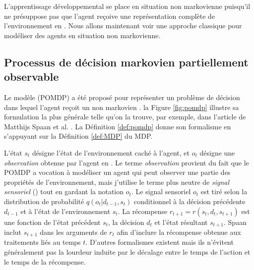 L'apprentissage développemental se place en situation non markovienne puisqu'il ne présuppose pas que l'agent reçoive une représentation complète de l'environnement en .
Nous allons maintenant voir une approche classique pour modéliser des agents en situation non markovienne. 



\subsection{Processus de décision markovien partiellement observable}
\label{sec:pomdp}

\noindent
Le modèle  (POMDP) a été proposé pour représenter un problème de décision dans lequel l'agent reçoit un  non markovien \cite{kaelbling_planning_1998}. 
la Figure \ref{fig:pomdp} illustre sa formulation la plus générale telle qu'on la trouve, par exemple, dans l'article de Matthijs Spaan et al. \cite{spaan_partially_2012}. 
La Définition \ref{def:pomdp} donne son formalisme en s'appuyant sur la Définition \ref{def:MDP} du MDP.

L'état $s_t$ désigne l'état de l'environnement caché à l'agent, et $o_t$ désigne une \emph{observation} obtenue par l'agent en .
Le terme \emph{observation} provient du fait que le POMDP a vocation à modéliser un agent qui peut observer une partie des propriétés de l'environnement, mais j'utilise le terme plus neutre de \emph{signal sensoriel} () tout en gardant la notation $o_t$.
Le signal sensoriel $o_t$ est tiré selon la distribution de probabilité $q(o_{t}|d_{t-1}, s_t)$ conditionnel à la décision précédente $d_{t-1}$ et à l'état de l'environnement $s_t$. 
La récompense $r_{t+1} = r(s_{t}, d_{t}, s_{t+1})$ est une fonction de l'état précédent $s_{t}$, la décision $d_{t}$ et l'état résultant $s_{t+1}$. 
Spaan inclut $s_{t+1}$ dans les arguments de $r_t$ afin d'inclure la récompense obtenue aux traitements liés au temps $t$. 
D'autres formalismes existent mais ils n'évitent généralement pas la lourdeur induite par le décalage entre le temps de l'action et le temps de la récompense.


